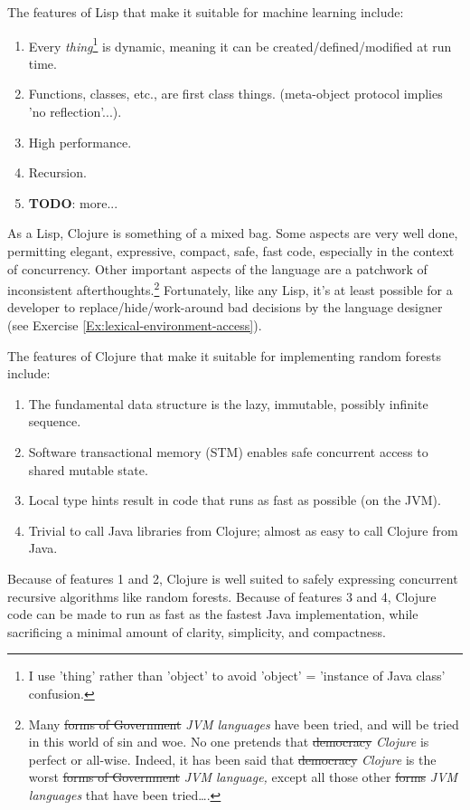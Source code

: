 \documentclass[10pt,openany]{article}
\numberwithin{definition}{section}
\numberwithin{example}{section}
\numberwithin{equation}{section}
\numberwithin{figure}{section}
\begin{document}
The features of Lisp that make it suitable for machine learning include:
\begin{enumerate}
\item Every \emph{thing}\footnote{I use 'thing' rather than 'object' to avoid 'object' = 'instance of
Java class' confusion.}\emph{ }is dynamic, meaning it can be created/defined/modified at
run time. 
\item Functions, classes, etc., are first class things. (meta-object protocol
implies 'no reflection'...). 
\item High performance.
\item Recursion.
\item \textbf{TODO}: more...
\end{enumerate}
As a Lisp, Clojure 
\cite{emerick2011clojure,fogus2011clojure,halloway2009clojure,rathore2011clojure,vanderhart2009clojure}
is something of a mixed bag. Some aspects are very well done, permitting
elegant, expressive, compact, safe, fast code, especially in the context
of concurrency. Other important aspects of the language are a patchwork
of inconsistent afterthoughts.\footnote{Many \sout{forms of Government}
 \emph{JVM languages} have been
tried, and will be tried in this world of sin and woe. No one pretends
that \sout{democracy} \emph{Clojure} is perfect or all-wise. Indeed,
it has been said that \sout{democracy} \emph{Clojure} is the worst
\sout{forms of Government} \emph{JVM language,} except all those
other \sout{forms} \emph{JVM languages} that have been 
tried\ldots{}.\cite{churchill-democracy-1947}} 
Fortunately, like any Lisp, it's at least possible for a developer
to replace/hide/work-around bad decisions by the language designer
(see Exercise \ref{Ex:lexical-environment-access}).

The features of Clojure that make it suitable for implementing random
forests include:
\begin{enumerate}
\item The fundamental data structure is the lazy, immutable, possibly infinite
sequence.
\item Software transactional memory (STM) enables safe concurrent access
to shared mutable state.
\item Local type hints result in code that runs as fast as possible (on
the JVM).
\item Trivial to call Java libraries from Clojure; almost as easy to call
Clojure from Java.
\end{enumerate}
Because of features 1 and 2, Clojure is well suited to safely expressing
concurrent recursive algorithms like random forests. Because of features
3 and 4, Clojure code can be made to run as fast as the fastest Java
implementation, while sacrificing a minimal amount of clarity, simplicity,
and compactness. 
\end{document}
